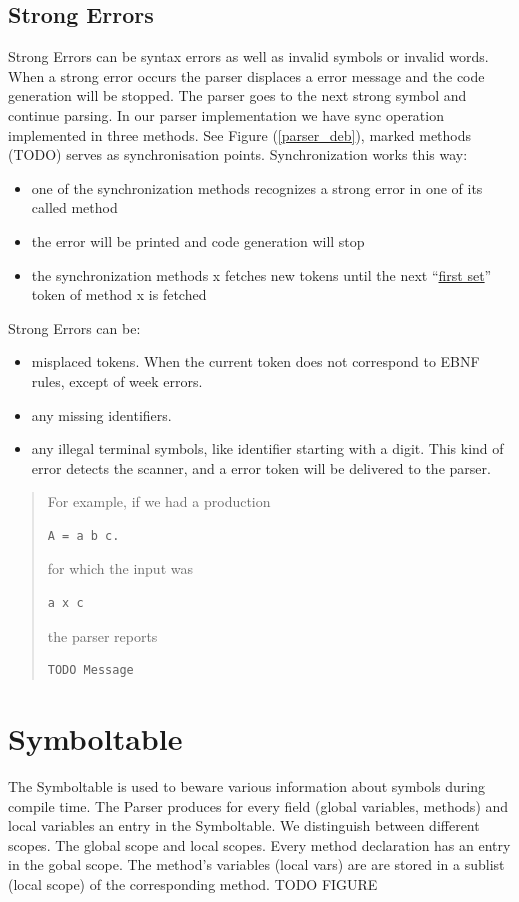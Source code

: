 \subsection{Strong Errors}
\label{label_strong_errors}
Strong Errors can be syntax errors as well as invalid symbols or invalid words. When a strong error occurs the parser displaces a error
message and the code generation will be stopped. The parser goes to the next strong symbol and continue parsing. In our parser
implementation we have sync operation implemented in three methods. See Figure (\ref{parser_deb}), marked methods (TODO) serves as
synchronisation points. Synchronization works this way:
\begin{itemize}
  \item one of the synchronization methods recognizes a strong error in one of its called method
  \item the error will be printed and code generation will stop
  \item the synchronization methods x fetches new tokens until the next ``\hyperref[first_sets]{first set}'' token of method x is fetched
\end{itemize}
Strong Errors can be:
\begin{itemize}
  \item misplaced tokens. When the current token does not correspond to EBNF rules, except of week errors.
  \item any missing identifiers.
  \item any illegal terminal symbols, like identifier starting with a digit. This kind of error detects the scanner, and a
  error token will be delivered to the parser.
\end{itemize}
\begin{quote}
For example, if we had a production
\begin{verbatim}
A = a b c.
\end{verbatim}
for which the input was
\begin{verbatim}
a x c
\end{verbatim}
the parser reports
\begin{verbatim}
TODO Message
\end{verbatim}
\end{quote}


\section{Symboltable}

The Symboltable is used to beware various information about symbols during compile time.
The Parser produces for every field (global variables, methods) and local variables an entry in the Symboltable.
We distinguish between different scopes. The global scope and local scopes. Every
method declaration has an entry in the gobal scope. The method's variables (local vars) are are stored in a sublist (local scope) of the corresponding method. TODO FIGURE


